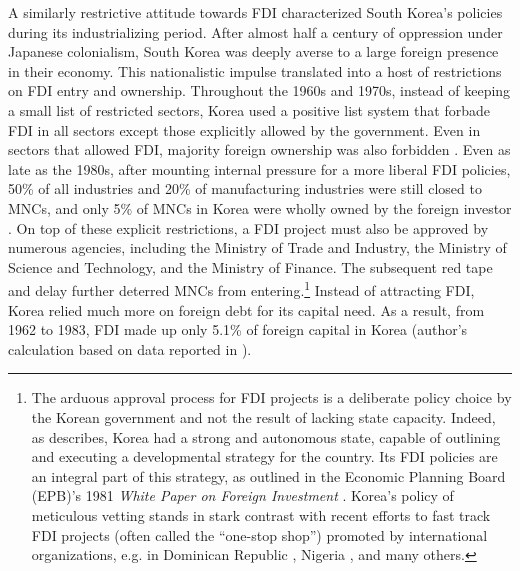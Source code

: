 A similarly restrictive attitude towards FDI characterized South Korea's
policies during its industrializing period. After almost half a century of
oppression under Japanese colonialism, South Korea was deeply averse to a large
foreign presence in their economy. This nationalistic impulse translated into a
host of restrictions on FDI entry and ownership. Throughout the 1960s and 1970s,
instead of keeping a small list of restricted sectors, Korea used a positive
list system that forbade FDI in all sectors except those explicitly allowed by
the government. Even in sectors that allowed FDI, majority foreign ownership was
also forbidden \citep{Thurbon2006}. Even as late as the 1980s, after mounting
internal pressure for a more liberal FDI policies, 50\% of all industries and
20\% of manufacturing industries were still closed to MNCs, and only 5\% of MNCs
in Korea were wholly owned by the foreign investor \citep{Chang2004}. On top of
these explicit restrictions, a FDI project must also be approved by numerous
agencies, including the Ministry of Trade and Industry, the Ministry of Science
and Technology, and the Ministry of Finance. The subsequent red tape and delay
further deterred MNCs from entering.\footnote{The arduous approval process for
  FDI projects is a deliberate policy choice by the Korean government and not
  the result of lacking state capacity. Indeed, as \citet{Evans1995} describes,
  Korea had a strong and autonomous state, capable of outlining and executing a
  developmental strategy for the country. Its FDI policies are an integral part
  of this strategy, as outlined in the Economic Planning Board (EPB)'s 1981
  \textit{White Paper on Foreign Investment} \citep{EconomicPlanningBoard1981}.
  Korea's policy of meticulous vetting stands in stark contrast with recent
  efforts to fast track FDI projects (often called the ``one-stop shop'')
  promoted by international organizations, e.g. in Dominican Republic
  \citep{UNCTAD2016}, Nigeria \citep{UNCTAD-Nigeria2009}, and many others.}
Instead of attracting FDI, Korea relied much more on foreign debt for its
capital need. As a result, from 1962 to 1983, FDI made up only 5.1\% of foreign
capital in Korea (author's calculation based on data reported in \citet[92,
Table 4.5]{Amsden1989}).

